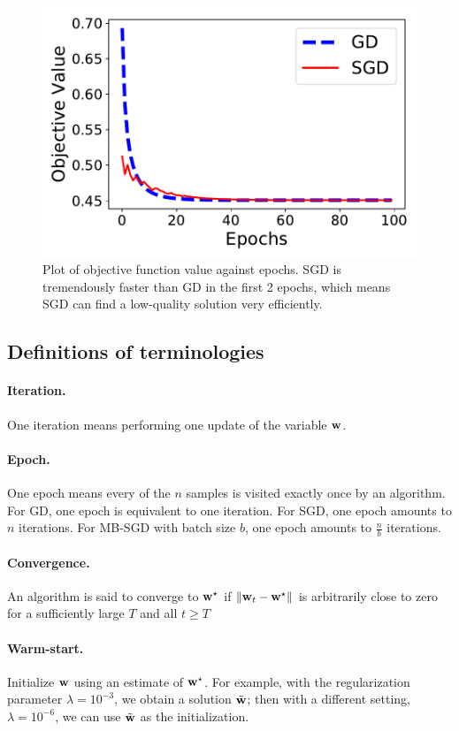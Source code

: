 \documentclass[11pt]{article}
\numberwithin{equation}{section}
\def\w{{\bf w}}
\begin{document}
\begin{figure}[!h]
	\centering
	\includegraphics[width=0.6\linewidth]{figures/compare_gd_sgd.pdf}
	\caption{Plot of objective function value against epochs.
		SGD is tremendously faster than GD in the first 2 epochs,
		which means SGD can find a low-quality solution very efficiently.}
	\label{fig:compare_gd_sgd}
\end{figure}







\subsection{Definitions of terminologies} \label{sec:alg:terminologies}



\paragraph{Iteration.}
One iteration means performing one update of the variable $\w$.

\paragraph{Epoch.}
One epoch means every of the $n$ samples is visited exactly once by an algorithm.
For GD, one epoch is equivalent to one iteration.
For SGD, one epoch amounts to $n$ iterations.
For MB-SGD with batch size $b$, one epoch amounts to $\frac{n}{b}$ iterations.


\paragraph{Convergence.}
An algorithm is said to converge to $\w^\star$ 
if $\| \w_t - \w^\star \|$ is arbitrarily close to zero for a sufficiently large $T$ and all $t \geq T$


\paragraph{Warm-start.}
Initialize $\w$ using an estimate of $\w^\star$.
For example, with the regularization parameter $\lambda = 10^{-3}$, we obtain a solution $\tilde{\w}$;
then with a different setting, $\lambda = 10^{-6}$, we can use $\tilde{\w}$ as the initialization.
\end{document}
